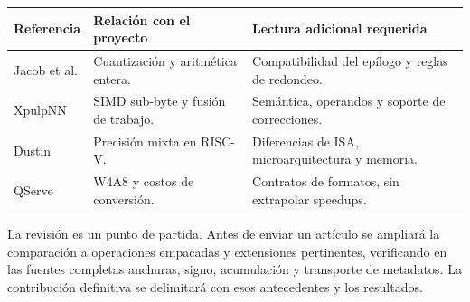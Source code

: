 \begin{tabularx}{\textwidth}{@{}lYY@{}}
\toprule
\textbf{Referencia} & \textbf{Relación con el proyecto} & \textbf{Lectura adicional requerida}\\\midrule
Jacob et al. & Cuantización y aritmética entera. & Compatibilidad del epílogo y reglas de redondeo.\\
XpulpNN & SIMD sub-byte y fusión de trabajo. & Semántica, operandos y soporte de correcciones.\\
Dustin & Precisión mixta en RISC-V. & Diferencias de ISA, microarquitectura y memoria.\\
QServe & W4A8 y costos de conversión. & Contratos de formatos, sin extrapolar speedups.\\\bottomrule
\end{tabularx}\par

La revisión es un punto de partida. Antes de enviar un artículo se ampliará
la comparación a operaciones empacadas y extensiones pertinentes, verificando
en las fuentes completas anchuras, signo, acumulación y transporte de metadatos.
La contribución definitiva se delimitará con esos antecedentes y los resultados.
